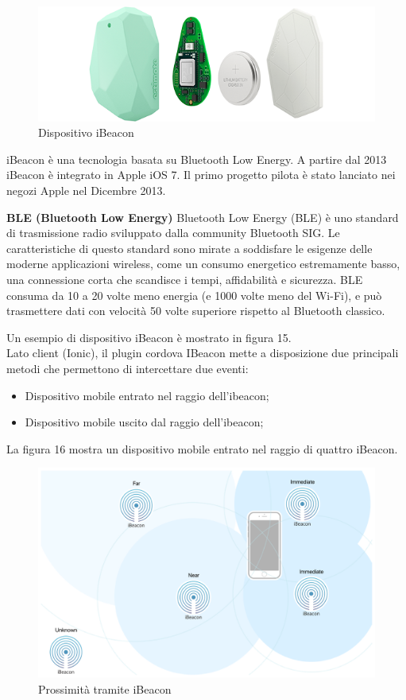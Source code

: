 \begin{figure}[H]
    \centering  
    \caption{Dispositivo iBeacon}
    \includegraphics[scale=0.3]{img/cap2/beacon}
\end{figure}

iBeacon è una tecnologia basata su Bluetooth Low Energy. A partire dal 2013 iBeacon è 
integrato in Apple iOS 7. Il primo progetto pilota è stato lanciato nei negozi Apple nel
Dicembre 2013.

\textbf{BLE (Bluetooth Low Energy)}
Bluetooth Low Energy (BLE) è uno standard di trasmissione radio sviluppato dalla community 
Bluetooth SIG. Le caratteristiche di questo standard sono mirate a soddisfare le esigenze
delle moderne applicazioni wireless, come un consumo energetico estremamente basso, una
connessione corta che scandisce i tempi, affidabilità e sicurezza. 
BLE consuma da 10 a 20 volte meno energia (e 1000 volte meno del Wi-Fi), e può trasmettere
dati con velocità 50 volte superiore rispetto al Bluetooth classico. 

Un esempio di dispositivo iBeacon è mostrato in figura 15.\\
Lato client (Ionic), il plugin cordova IBeacon mette a disposizione due principali metodi
che permettono di intercettare due eventi:

\begin{itemize}
    \item Dispositivo mobile entrato nel raggio dell'ibeacon;
    \item Dispositivo mobile uscito dal raggio dell'ibeacon;
\end{itemize}

La figura 16 mostra un dispositivo mobile entrato nel raggio di quattro iBeacon.
\begin{figure}[H]
    \centering  
    \caption{Prossimità tramite iBeacon}
    \includegraphics[scale=0.3]{img/cap2/beacon-proximity}
\end{figure}



